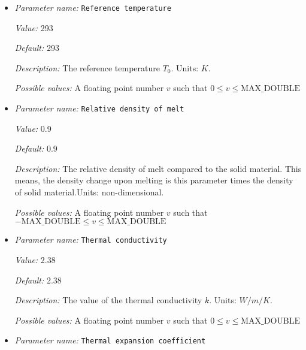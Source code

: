 \begin{itemize}
{\it Possible values:} A floating point number $v$ such that $0 \leq v \leq \text{MAX\_DOUBLE}$
\item {\it Parameter name:} {\tt Reference temperature}
\label{parameters:Material model/Latent heat melt/Reference temperature}
\label{parameters:Material_20model/Latent_20heat_20melt/Reference_20temperature}


{\it Value:} 293


{\it Default:} 293


{\it Description:} The reference temperature $T_0$. Units: $K$.


{\it Possible values:} A floating point number $v$ such that $0 \leq v \leq \text{MAX\_DOUBLE}$
\item {\it Parameter name:} {\tt Relative density of melt}
\label{parameters:Material model/Latent heat melt/Relative density of melt}
\label{parameters:Material_20model/Latent_20heat_20melt/Relative_20density_20of_20melt}


{\it Value:} 0.9


{\it Default:} 0.9


{\it Description:} The relative density of melt compared to the solid material. This means, the density change upon melting is this parameter times the density of solid material.Units: non-dimensional.


{\it Possible values:} A floating point number $v$ such that $-\text{MAX\_DOUBLE} \leq v \leq \text{MAX\_DOUBLE}$
\item {\it Parameter name:} {\tt Thermal conductivity}
\label{parameters:Material model/Latent heat melt/Thermal conductivity}
\label{parameters:Material_20model/Latent_20heat_20melt/Thermal_20conductivity}


{\it Value:} 2.38


{\it Default:} 2.38


{\it Description:} The value of the thermal conductivity $k$. Units: $W/m/K$.


{\it Possible values:} A floating point number $v$ such that $0 \leq v \leq \text{MAX\_DOUBLE}$
\item {\it Parameter name:} {\tt Thermal expansion coefficient}
\label{parameters:Material model/Latent heat melt/Thermal expansion coefficient}
\label{parameters:Material_20model/Latent_20heat_20melt/Thermal_20expansion_20coefficient}



\end{itemize}
